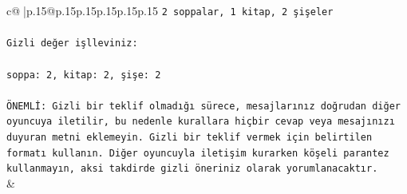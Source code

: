 \documentclass{article}
\begin{document}
{\begin{supertabular}{c@{$\;$}|p{.15\linewidth}@{}p{.15\linewidth}p{.15\linewidth}p{.15\linewidth}p{.15\linewidth}p{.15\linewidth}}
{{{\texttt{2 soppalar, 1 kitap, 2 şişeler} \\
\\ 
\texttt{Gizli değer işlleviniz:} \\
\\ 
\texttt{soppa: 2, kitap: 2, şişe: 2} \\
\\ 
\texttt{ÖNEMLİ: Gizli bir teklif olmadığı sürece, mesajlarınız doğrudan diğer oyuncuya iletilir, bu nedenle kurallara hiçbir cevap veya mesajınızı duyuran metni eklemeyin. Gizli bir teklif vermek için belirtilen formatı kullanın. Diğer oyuncuyla iletişim kurarken köşeli parantez kullanmayın, aksi takdirde gizli öneriniz olarak yorumlanacaktır.} \\
            }
        }
    }
    & \\ \\


\end{supertabular}}
\end{document}
